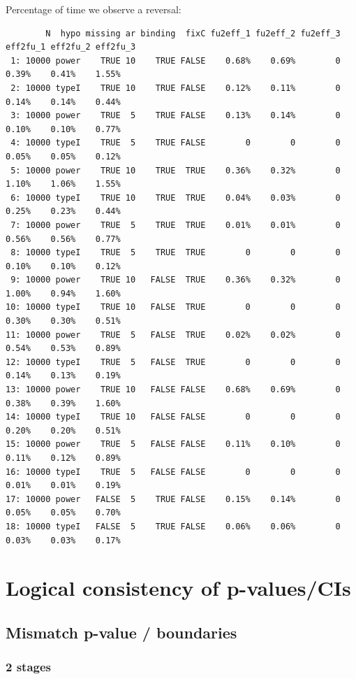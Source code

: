 \documentclass[12pt]{article}
\begin{document}
Percentage of time we observe a reversal:
\begin{verbatim}
        N  hypo missing ar binding  fixC fu2eff_1 fu2eff_2 fu2eff_3 eff2fu_1 eff2fu_2 eff2fu_3
 1: 10000 power    TRUE 10    TRUE FALSE    0.68%    0.69%        0    0.39%    0.41%    1.55%
 2: 10000 typeI    TRUE 10    TRUE FALSE    0.12%    0.11%        0    0.14%    0.14%    0.44%
 3: 10000 power    TRUE  5    TRUE FALSE    0.13%    0.14%        0    0.10%    0.10%    0.77%
 4: 10000 typeI    TRUE  5    TRUE FALSE        0        0        0    0.05%    0.05%    0.12%
 5: 10000 power    TRUE 10    TRUE  TRUE    0.36%    0.32%        0    1.10%    1.06%    1.55%
 6: 10000 typeI    TRUE 10    TRUE  TRUE    0.04%    0.03%        0    0.25%    0.23%    0.44%
 7: 10000 power    TRUE  5    TRUE  TRUE    0.01%    0.01%        0    0.56%    0.56%    0.77%
 8: 10000 typeI    TRUE  5    TRUE  TRUE        0        0        0    0.10%    0.10%    0.12%
 9: 10000 power    TRUE 10   FALSE  TRUE    0.36%    0.32%        0    1.00%    0.94%    1.60%
10: 10000 typeI    TRUE 10   FALSE  TRUE        0        0        0    0.30%    0.30%    0.51%
11: 10000 power    TRUE  5   FALSE  TRUE    0.02%    0.02%        0    0.54%    0.53%    0.89%
12: 10000 typeI    TRUE  5   FALSE  TRUE        0        0        0    0.14%    0.13%    0.19%
13: 10000 power    TRUE 10   FALSE FALSE    0.68%    0.69%        0    0.38%    0.39%    1.60%
14: 10000 typeI    TRUE 10   FALSE FALSE        0        0        0    0.20%    0.20%    0.51%
15: 10000 power    TRUE  5   FALSE FALSE    0.11%    0.10%        0    0.11%    0.12%    0.89%
16: 10000 typeI    TRUE  5   FALSE FALSE        0        0        0    0.01%    0.01%    0.19%
17: 10000 power   FALSE  5    TRUE FALSE    0.15%    0.14%        0    0.05%    0.05%    0.70%
18: 10000 typeI   FALSE  5    TRUE FALSE    0.06%    0.06%        0    0.03%    0.03%    0.17%
\end{verbatim}


\clearpage

\section{Logical consistency of p-values/CIs}
\label{sec:org0f8a01c}

\subsection{Mismatch p-value / boundaries}
\label{sec:org0b4236a}
\subsubsection{2 stages}
\label{sec:org656cde0}
\end{document}
